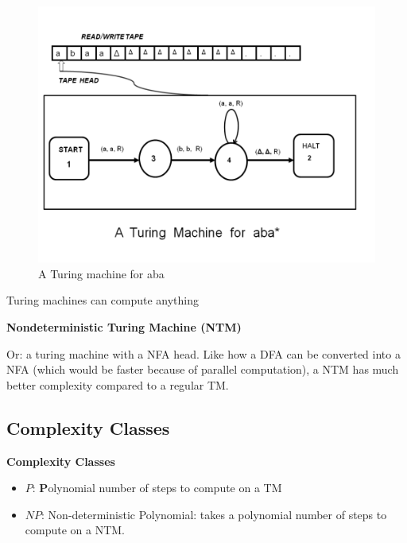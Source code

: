 \documentclass[../notes.tex]{subfiles}
\begin{document}
\begin{figure}[H]
	\centering
	\includegraphics[width=0.8\linewidth]{img/image_2022-11-25-20-18-39.png}
	\caption{A Turing machine for aba}
\end{figure}

Turing machines can compute anything



\begin{definition}
	\textbf{Nondeterministic Turing Machine (NTM)}

	Or: a turing machine with a NFA head. Like how a DFA can be converted into a NFA (which would be faster because of parallel computation), a NTM has much better complexity compared to a regular TM.

\end{definition}



\subsection{Complexity Classes}


\begin{definition}
	\textbf{Complexity Classes}

	\begin{itemize}
		\item $ P $: \textbf{P}olynomial number of steps to compute on a TM
		\item $ NP $: Non-deterministic Polynomial: takes a polynomial number of steps to compute on a NTM.
	\end{itemize}

\end{definition}
\end{document}
